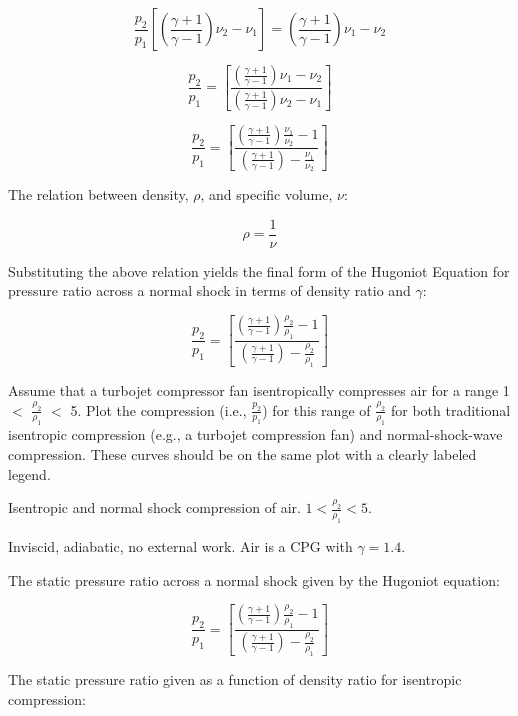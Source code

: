 \documentclass[../main.tex]{subfiles}
\begin{document}
\[
    \frac{p_2}{p_1} \left[{\left({\frac{\gamma+1}{\gamma-1}}\right) \nu_2 - \nu_1 }\right] =
    \left({\frac{\gamma+1}{\gamma-1}}\right) \nu_1 - \nu_2
\]

\[
    \frac{p_2}{p_1} = \left[{
        \frac{\left({\frac{\gamma+1}{\gamma-1}}\right) \nu_1 - \nu_2}{{\left({\frac{\gamma+1}{\gamma-1}}\right) \nu_2 - \nu_1 }}
    }\right]
\]

\[
    \frac{p_2}{p_1} = \left[{
        \frac{\left({\frac{\gamma+1}{\gamma-1}}\right) \frac{\nu_1}{\nu_2} - 1}{{\left({\frac{\gamma+1}{\gamma-1}}\right) - \frac{\nu_1}{\nu_2} }}
    }\right]
\]

The relation between density, \(\rho\), and specific volume, \(\nu\):

\[
    \rho = \frac{1}{\nu}
\]

Substituting the above relation yields the final form of the Hugoniot Equation for pressure ratio across a normal shock in terms of density ratio and \(\gamma\):

\[
    \boxed{
    \frac{p_2}{p_1} = \left[{
        \frac{\left({\frac{\gamma+1}{\gamma-1}}\right) \frac{\rho_2}{\rho_1} - 1}{{\left({\frac{\gamma+1}{\gamma-1}}\right) - \frac{\rho_2}{\rho_1} }}
    }\right]
    }
\]


Assume that a turbojet compressor fan isentropically compresses air for a range 1 \(<\) \(\frac{\rho_2}{\rho_1}\) \(<\) 5. 
Plot the compression (i.e., \(\frac{p_2}{p_1}\)) for this range of \(\frac{\rho_2}{\rho_1}\) for both traditional isentropic compression (e.g., a turbojet compression fan) and normal-shock-wave compression. 
These curves should be on the same plot with a clearly labeled legend.

\givens{}
Isentropic and normal shock compression of air.
\(1 < \frac{\rho_2}{\rho_1} < 5\).

\assumptions{}
Inviscid, adiabatic, no external work. Air is a CPG with \(\gamma =1.4\).

\solution{}

The static pressure ratio across a normal shock given by the Hugoniot equation:

\[
    \frac{p_2}{p_1} = \left[{
        \frac{\left({\frac{\gamma+1}{\gamma-1}}\right) \frac{\rho_2}{\rho_1} - 1}{{\left({\frac{\gamma+1}{\gamma-1}}\right) - \frac{\rho_2}{\rho_1} }}
    }\right]
\]

The static pressure ratio given as a function of density ratio for isentropic compression:
\end{document}
